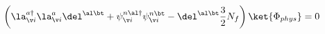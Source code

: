 \begin{equation}
 \left(\la^{a\dag}_{\v i}\la^a_{\v i}\del^{\al\bt}
+\psi^{n\al \dag}_{\v i}\psi^{n\bt}_{\v i} 
-\del^{\al\bt}\frac{3}{2}N_f \right) \ket{\Phi_{phys}} =0
\end{equation}

